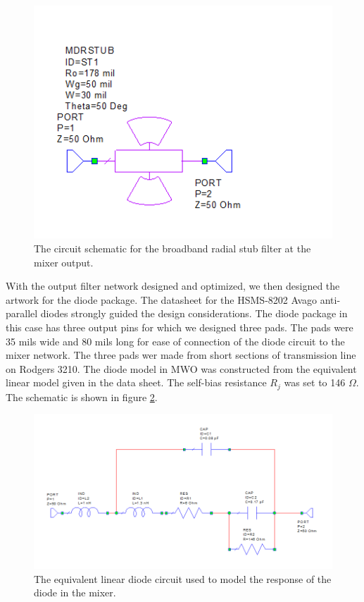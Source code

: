 \documentclass[twocolumn, aps, floatfix]{revtex4-1}
\begin{document}
\begin{figure}[!htbp]
    \includegraphics[scale=0.7]{radial_stub.png}
    \caption{The circuit schematic for the broadband radial stub filter at the mixer output.}
    \label{fig:radialstub}
\end{figure}

With the output filter network designed and optimized, we then designed the artwork for the diode package. The datasheet for the HSMS-8202 Avago anti-parallel diodes strongly guided the design considerations. The diode package in this case has three output pins for which we designed three pads. The pads were 35 mils wide and 80 mils long for ease of connection of the diode circuit to the mixer network. The three pads wer made from short sections of transmission line on Rodgers 3210. The diode model in MWO was constructed from the equivalent linear model given in the data sheet. The self-bias resistance $R_j$ was set to 146 $\Omega$. The schematic is shown in figure \ref{fig:diodemodel}. 

\begin{figure}[!htbp]
    \includegraphics[scale=0.4]{diode_circuit.png}
    \caption{The equivalent linear diode circuit used to model the response of the diode in the mixer.}
    \label{fig:diodemodel}
\end{figure}
\end{document}
